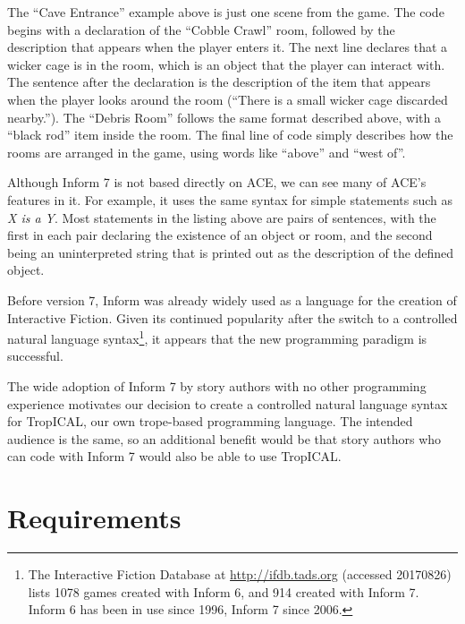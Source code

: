 \documentclass[11pt]{report}
\begin{document}
The ``Cave Entrance'' example above is just one scene from the game. The code
begins with a declaration of the ``Cobble Crawl'' room, followed by the
description that appears when the player enters it. The next line declares that
a wicker cage is in the room, which is an object that the player can interact
with. The sentence after the declaration is the description of the item that
appears when the player looks around the room (``There is a small wicker cage
discarded nearby.'').
The ``Debris Room'' follows the same format described above, with a ``black
rod'' item inside the room. The final line of code simply describes how the
rooms are arranged in the game, using words like ``above'' and ``west of''.

Although Inform 7 is not based directly on ACE, we can see many of ACE's
features in it. For example, it uses the same syntax for simple statements such
as \emph{X is a Y}. Most statements in the listing above are pairs of sentences,
with the first in each pair declaring the existence of an object or room, and
the second being an uninterpreted string that is printed out as the description
of the defined object.

Before version 7, Inform was already widely used as a language for the creation
of Interactive Fiction. Given its continued popularity after the switch to
a controlled natural language syntax\footnote{The Interactive Fiction Database
  at \url{http://ifdb.tads.org} (accessed 20170826) lists 1078 games created
  with Inform 6, and 914 created with Inform 7. Inform 6 has been in use since
  1996, Inform 7 since 2006.}, it appears that the new programming
paradigm is successful.

The wide adoption of Inform 7 by story authors with no other programming
experience motivates our decision to create a controlled natural language syntax
for TropICAL, our own trope-based programming language. The intended audience is
the same, so an additional benefit would be that story authors who can code with
Inform 7 would also be able to use TropICAL.

\section{Requirements}
\label{sec:t-requirements}
\end{document}
